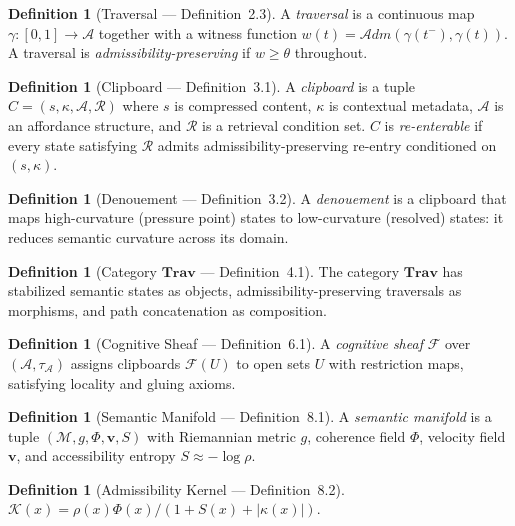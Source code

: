 \documentclass[12pt,oneside]{book}
\theoremstyle{plain}
\theoremstyle{definition}
\newtheorem{definition}[theorem]{Definition}
\theoremstyle{plain}
\newcommand{\Trav}{\mathbf{Trav}}
\newcommand{\cA}{\mathcal{A}}
\newcommand{\cM}{\mathcal{M}}
\newcommand{\cR}{\mathcal{R}}
\begin{document}
\begin{definition}[Traversal --- Definition~2.3]
A \emph{traversal} is a continuous map $\gamma : [0,1] \to \cA$ together with a witness function $w(t) = \mathcal{A}dm(\gamma(t^-), \gamma(t))$. A traversal is \emph{admissibility-preserving} if $w \geq \theta$ throughout.
\end{definition}

\begin{definition}[Clipboard --- Definition~3.1]
A \emph{clipboard} is a tuple $C = (s, \kappa, \cA, \cR)$ where $s$ is compressed content, $\kappa$ is contextual metadata, $\cA$ is an affordance structure, and $\cR$ is a retrieval condition set. $C$ is \emph{re-enterable} if every state satisfying $\cR$ admits admissibility-preserving re-entry conditioned on $(s, \kappa)$.
\end{definition}

\begin{definition}[Denouement --- Definition~3.2]
A \emph{denouement} is a clipboard that maps high-curvature (pressure point) states to low-curvature (resolved) states: it reduces semantic curvature across its domain.
\end{definition}

\begin{definition}[Category $\Trav$ --- Definition~4.1]
The category $\Trav$ has stabilized semantic states as objects, admissibility-preserving traversals as morphisms, and path concatenation as composition.
\end{definition}

\begin{definition}[Cognitive Sheaf --- Definition~6.1]
A \emph{cognitive sheaf} $\mathcal{F}$ over $(\cA, \tau_\cA)$ assigns clipboards $\mathcal{F}(U)$ to open sets $U$ with restriction maps, satisfying locality and gluing axioms.
\end{definition}

\begin{definition}[Semantic Manifold --- Definition~8.1]
A \emph{semantic manifold} is a tuple $(\cM, g, \Phi, \mathbf{v}, S)$ with Riemannian metric $g$, coherence field $\Phi$, velocity field $\mathbf{v}$, and accessibility entropy $S \approx -\log \rho$.
\end{definition}

\begin{definition}[Admissibility Kernel --- Definition~8.2]
$\mathcal{K}(x) = \rho(x)\Phi(x) / (1 + S(x) + |\kappa(x)|)$.
\end{definition}
\end{document}
